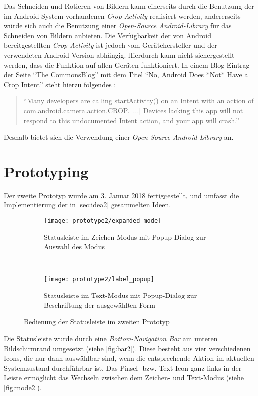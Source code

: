 Das Schneiden und Rotieren von Bildern kann einerseits durch die Benutzung der im Android-System vorhandenen \emph{Crop-Activity} realisiert werden, andererseits würde sich auch die Benutzung einer \emph{Open-Source Android-Library} für das Schneiden von Bildern anbieten.
Die Verfügbarkeit der von Android bereitgestellten \emph{Crop-Activity} ist jedoch vom Gerätehersteller und der verwendeten Android-Version abhängig.
Hierdurch kann nicht sichergestellt werden, dass die Funktion auf allen Geräten funktioniert.
In einem Blog-Eintrag der Seite ``The CommonsBlog'' mit dem Titel ``No, Android Does *Not* Have a Crop Intent'' steht hierzu folgendes \citep{Commonsware13}:
\begin{quote}
  ``Many developers are calling startActivity() on an Intent with an action of com.android.camera.action.CROP.
  [...] Devices lacking this app will not respond to this undocumented Intent action, and your app will crash.'' 
\end{quote}

\noindent
Deshalb bietet sich die Verwendung einer \emph{Open-Source Android-Library} an.

\section{Prototyping}
Der zweite Prototyp wurde am 3. Januar 2018 fertiggestellt, und umfasst die Implementierung der in \autoref{sec:idea2} gesammelten Ideen. \\

\begin{figure}[h]
  \begin{subfigure}[t]{0.4\textwidth}
    \centering
    \texttt{[image: prototype2/expanded\_mode]}
    \caption{Statusleiste im Zeichen-Modus mit Popup-Dialog zur Auswahl des Modus}
    \label{fig:mode2}
  \end{subfigure}
  ~
  \begin{subfigure}[t]{0.4\textwidth}
    \centering
    \texttt{[image: prototype2/label\_popup]}
    \caption{Statusleiste im Text-Modus mit Popup-Dialog zur Beschriftung der ausgewählten Form}
    \label{fig:labelp2}
  \end{subfigure}
  \centering
  \caption{Bedienung der Statusleiste im zweiten Prototyp}
  \label{fig:bar2}
\end{figure}

Die Statusleiste wurde durch eine \emph{Bottom-Navigation Bar} am unteren Bildschirmrand umgesetzt (siehe \autoref{fig:bar2}).
Diese besteht aus vier verschiedenen Icons, die nur dann auswählbar sind, wenn die entsprechende Aktion im aktuellen Systemzustand durchführbar ist.
Das Pinsel- bzw. Text-Icon ganz links in der Leiste ermöglicht das Wechseln zwischen dem Zeichen- und Text-Modus (siehe \autoref{fig:mode2}). \\

